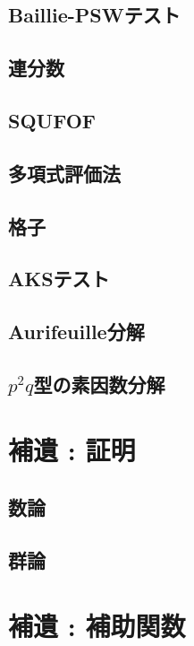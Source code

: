 \subsection{Baillie-PSWテスト}

\subsection{連分数}

\subsection{SQUFOF}

\subsection{多項式評価法}

\subsection{格子}

\subsection{AKSテスト}

\subsection{Aurifeuille分解}

\subsection{$p^2q$型の素因数分解}


\section{補遺 : 証明}
\subsection{数論}

\subsection{群論}

\section{補遺 : 補助関数}


\newpage
\printindex



